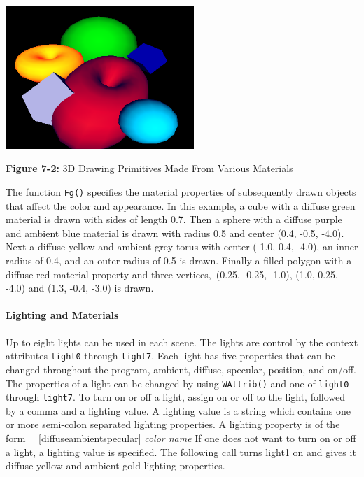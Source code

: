 
\includegraphics[width=2.8071in,height=2.1335in]{ub-img/ub-img32.png} 

{\sffamily\bfseries Figure 7-2:}
{\sffamily 3D Drawing Primitives Made From Various Materials}

\bigskip

The function \texttt{Fg()} specifies the material properties of
subsequently drawn objects that affect the color and appearance.
In this example, a cube with a diffuse green material is
drawn with sides of length 0.7. Then a sphere with a diffuse purple and
ambient blue material is drawn with radius 0.5 and center (0.4, -0.5,
-4.0). Next a diffuse yellow and ambient grey torus with center (-1.0,
0.4, -4.0), an inner radius of 0.4, and an outer radius of 0.5 is
drawn. Finally a filled polygon with a diffuse red material property
and three vertices,\texttt{ }(0.25, -0.25, -1.0), (1.0, 0.25, -4.0) and
(1.3, -0.4, -3.0) is drawn. 

\paragraph{Lighting and Materials}
Up to eight lights can be used in each scene. The
lights are control by the context attributes \texttt{light0} through
\texttt{light7}.
Each light has five properties that can be changed throughout the
program, ambient, diffuse, specular, position, and on/off. The
properties of a light can be changed by using \texttt{WAttrib()} and one of
\texttt{light0} through \texttt{light7}. To turn on or off a light,
assign on or off to the light, followed by a comma and a lighting value.
A lighting value is a string which contains one or more semi-colon
separated lighting properties. A lighting property is of the form
\newline
 \ \ [diffuse{\textbar}ambient{\textbar}specular] \textit{color
name}\newline
If one does not want to turn on or off a light, a lighting value is
specified. The following call turns light1 on and gives it diffuse
yellow and ambient gold lighting properties. 

